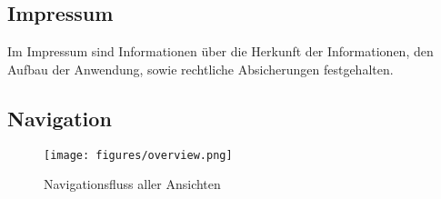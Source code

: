 \subsection{Impressum}
Im Impressum sind Informationen über die Herkunft der Informationen, den Aufbau der Anwendung, sowie rechtliche Absicherungen festgehalten.


\subsection{Navigation}\label{section_navigation}


\begin{figure}
    \centering
        \texttt{[image: figures/overview.png]}
    \caption{Navigationsfluss aller Ansichten}
    \label{fig:overview}
\end{figure}